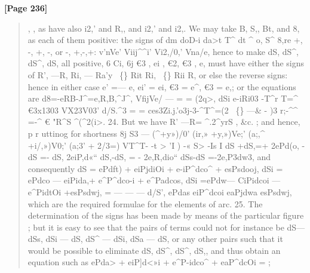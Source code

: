 \documentclass[11pt,a4paper]{book}
\begin{document}
\textbf{[Page 236]}\\[0.2cm]
\begin{quote}
, ,
as have also i2,' and R,, and i2,' and i2,. We may take B, S,, Bt, and 8, as each of them
positive: the signs of
dm doD-i da>t T\textasciicircum{} dt \textasciicircum{} o, S\textasciicircum{} 8,re +, -, +, -, or -, +,-,+:
v'nVe' Viij\textasciicircum{}\textasciicircum{}i' Vi2,/0,' Vna/e,
hence to make dS, dS\textasciicircum{}, dS\textasciicircum{}, dS, all positive,
6 Ci, 6j €3 , ei , €2, €3 , e,
must have either the signs of
R', ---R, Ri, --- Ra'y ~\{\} Rit Ri, ~\{\} Rii R,
or else the reverse signs: hence in either case e' =--- e, ei' = ei, €3 = e\textasciicircum{}, €3 = e,; or the
equations are
d8=-eRB-J\textasciicircum{}=e,R,B,\textasciicircum{}J\textasciicircum{},
VfijVe/
---
= = (2q>,
dSi e-iRi03 -T\textasciicircum{}r T=\textasciicircum{} €3x1303
VX23V03'
d/S.\textasciicircum{}3
=
=
ces3Zi.j.'o3j-3-\textasciicircum{}T\textasciicircum{}=(2
~\{\}
---\&
-
)3
r;-\textasciicircum{}\textasciicircum{}
=-\textasciicircum{}
€
"R\textasciicircum{}S \textasciicircum{}(\textasciicircum{}2(i>.
24. But we have R'
---R=
\textasciicircum{}.2\textasciicircum{}yrS , \&c. ; and hence, p r uttinog for shortness
8j S3 ---
(\textasciicircum{}+y»)/0'
(ir,»
+y,»)Ve;'
(a;,\textasciicircum{}
+i/,»)V0;'
(a;3'
+
2/3=)
VT\textasciicircum{}T- -t > 'I ) -« S> -Is I
dS +dS,=+ 2ePd(o,
-dS =-
dS, 2eiP,d«``
dS,-dS, = - 2e,R,dio``
dSs-dS =-2e,P3dw3,
and consequently
dS = ePdft) + eiPjdiOi + e-iP\textasciicircum{}dco\textasciicircum{} + esPsdooj,
dSi = ePdco --- eiPida,+ e\textasciicircum{}P\textasciicircum{}dco-i + e\textasciicircum{}Padcos,
dSi =ePdw--- CiPidcoi --- e\textasciicircum{}PidtOi +esPsdwj,
= --- --- ---
d/S', ePdas eiP\textasciicircum{}dcoi eaPjdwa esPsdwj,
which are the required formulae for the elements of arc.
25. The determination of the signs has been made by means of the particular
figure ; but it is easy to see that the pairs of terms could not for instance be
dS---dSs, dSi --- dS, dS\textasciicircum{} --- dSi, dSa --- dS, or any other pairs such that it would be
possible to eliminate dS, dS\textasciicircum{}, dS\textasciicircum{}, dS,, and thus obtain an equation such as
ePda> + eiP]d<»i + e\textasciicircum{}P-idco\textasciicircum{} + eaP\textasciicircum{}dcOi =
;
\end{quote}
\end{document}
